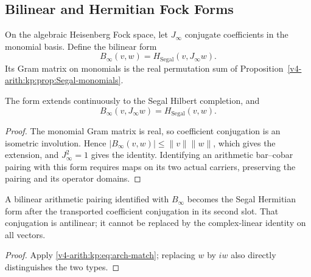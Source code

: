 \subsection{Bilinear and Hermitian Fock Forms}
\label{v4-arith:kp:arch:Koszul-infty}
On the algebraic Heisenberg Fock space, let \(J_\infty\) conjugate
coefficients in the monomial basis. Define the bilinear form
\begin{equation}
\label{v4-arith:kp:eq:Koszul-infty}
 B_\infty(v,w)=H_{\mathrm{Segal}}(v,J_\infty w).
\end{equation}
Its Gram matrix on monomials is the real permutation sum of
Proposition~\ref{v4-arith:kp:prop:Segal-monomials}.
\begin{proposition}
\label{v4-arith:kp:prop:arch-koszul-is-Segal}
The form extends continuously to the Segal Hilbert completion, and
\begin{equation}
\label{v4-arith:kp:eq:arch-match}
 B_\infty(v,J_\infty w)=H_{\mathrm{Segal}}(v,w).
\end{equation}
\end{proposition}
\begin{proof}
The monomial Gram matrix is real, so coefficient conjugation is an
isometric involution. Hence \(|B_\infty(v,w)|\le\|v\|\|w\|\),
which gives the extension, and \(J_\infty^2=1\) gives the identity.
Identifying an arithmetic bar--cobar pairing with this form requires
maps on its two actual carriers, preserving the pairing and its
operator domains.
\end{proof}
\begin{corollary}
\label{v4-arith:kp:cor:arch-involution}
A bilinear arithmetic pairing identified with \(B_\infty\) becomes
the Segal Hermitian form after the transported coefficient
conjugation in its second slot. That conjugation is antilinear; it
cannot be replaced by the complex-linear identity on all vectors.
\end{corollary}
\begin{proof}
Apply \eqref{v4-arith:kp:eq:arch-match}; replacing \(w\) by \(iw\)
also directly distinguishes the two types.
\end{proof}

